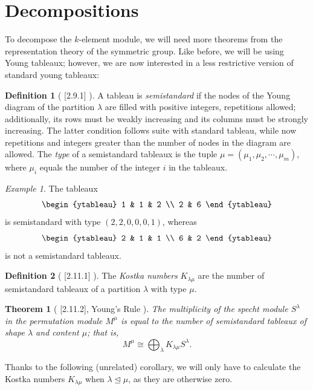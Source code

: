 \documentclass[12pt,twoside]{reedthesis}
\theoremstyle{plain}   %
\newtheorem{thm}{Theorem}[section] %
\theoremstyle{definition}
\newtheorem{defn}{Definition}[section]
\theoremstyle{remark}
\newtheorem{ex}{Example}[section]
\numberwithin{equation}{section}
\def\normeq{\trianglelefteq}
\begin{document}
  \section{Decompositions}
  To decompose the $k$-element module, we will need more theorems from the representation theory of the symmetric group.
  Like before, we will be using Young tableaux; however, we are now interested in a less restrictive version of standard young tableaux:
  \begin{defn}[{ \cite{sagan}[2.9.1] }]
    A tableau is \emph{semistandard} if the nodes of the Young diagram of the partition $\lambda$ are filled with positive integers, repetitions allowed;
    additionally, its rows must be weakly increasing and its columns must be strongly increasing.
    The latter condition follows suite with standard tableau, while now repetitions and integers greater than the number of nodes in the diagram are allowed.
    The \emph{type} of a semistandard tableaux is the tuple $\mu = (\mu_1, \mu_2, \cdots, \mu_m)$, where $\mu_i$ equals the number of the integer $i$ in the tableaux.
  \end{defn}
  \begin{ex}
    The tableaux
    \[
      \begin{ytableau}
        1 & 1 & 2 \\
        2 & 6 
      \end{ytableau}
    \]
    is semistandard with type $(2,2,0,0,0,1)$, whereas
    \[
      \begin{ytableau}
        2 & 1 & 1 \\
        6 & 2 
      \end{ytableau}
    \]
    is not a semistandard tableaux.
  \end{ex}
  \begin{defn}[{ \cite{sagan}[2.11.1] }]
    The \emph{Kostka numbers} $K_{\lambda \mu }$ are the number of semistandard tableaux of a partition $\lambda$ with type $\mu$.
  \end{defn}
  \begin{thm}[{ \cite{sagan}[2.11.2], Young's Rule }]
    The multiplicity of the specht module $S^\lambda$ in the permutation module $M^\mu$ is equal to the number of semistandard tableaux of shape $\lambda$ and content $\mu$; that is,
    \[ M^\mu \cong \bigoplus_\lambda K_{\lambda \mu} S^\lambda .\]
  \end{thm}
  Thanks to the following (unrelated) corollary, we will only have to calculate the Kostka numbers $K_{\lambda \mu}$ when $\lambda \normeq \mu$, as they are otherwise zero.
\end{document}
